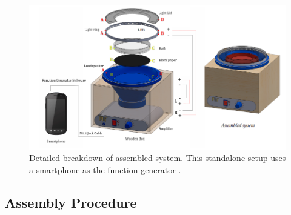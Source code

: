 \begin{figure}[h]
    \centering
    \includegraphics[width=\textwidth]{prototype/Apparatus_Diagram.png}
    \caption{Detailed breakdown of assembled system. This standalone setup uses a smartphone as the function generator \cite{harris2017visualization}.}
    \label{fig:expapparatus}
\end{figure}


\subsection{Assembly Procedure}

